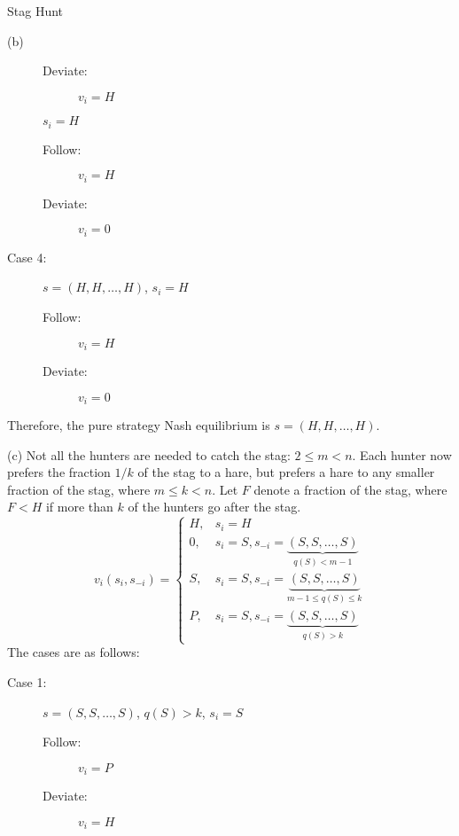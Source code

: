 \documentclass[10pt]{extarticle}
\begin{document}
\begin{problem}{Stag Hunt}
\begin{problem}{(b)}
\begin{multicols}{2}
\begin{description}
\begin{description}
              \item[Deviate:] $v_i = H$
            \end{description}
            $s_i = H$
            \begin{description}
              \item[Follow:] $v_i = H$
              \item[Deviate:] $v_i = 0$
            \end{description}
          \item[Case 4:] $s = (H,H,\dots,H)$, $s_i = H$
            \begin{description}
              \item[Follow:] $v_i = H$
              \item[Deviate:] $v_i = 0$
            \end{description} %
        \end{description}
      \end{multicols}
      Therefore, the pure strategy Nash equilibrium is $s = (H,H,\dots,H)$.
    \end{problem}
    \begin{problem}{(c)}
      Not all the hunters are needed to catch the stag: $2\leq m < n$. Each hunter now prefers the fraction $1/k$ of the stag to a hare, but prefers a hare to any smaller fraction of the stag, where $m\leq k < n$.
      \tcblower
      Let $F$ denote a fraction of the stag, where $F < H$ if more than $k$ of the hunters go after the stag.
      \[
        v_i(s_i,s_{-i}) = \begin{cases}
          H, & s_i = H\\
          0, & s_i = S, s_{-i} = \underbrace{(S,S,\dots,S)}_{q(S) < m-1}\\
          S, & s_i = S, s_{-i} = \underbrace{(S,S,\dots,S)}_{m-1\leq q(S) \leq k}\\
          P, & s_i = S, s_{-i} = \underbrace{(S,S,\dots,S)}_{q(S) > k}
        \end{cases}
      \] 
      The cases are as follows:
      \begin{multicols}{2}
        \begin{description}
          \item[Case 1:] $s = (S,S,\dots,S)$, $q(S) > k$, $s_i = S$
            \begin{description}
              \item[Follow:] $v_i = P$
              \item[Deviate:] $v_i = H$
            \end{description}

\end{description}
\end{multicols}
\end{problem}
\end{problem}
\end{document}
